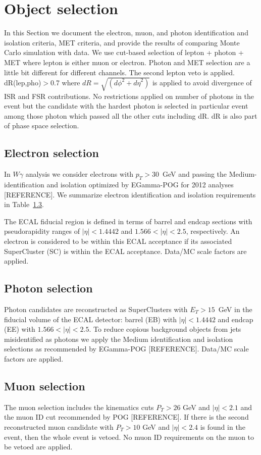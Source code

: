 \section{Object selection}
\label{sec:ObjectSelection}
In this Section we document the electron, muon,
and photon identification and isolation criteria, MET criteria, and provide the
results of comparing Monte Carlo simulation with data.
We use cut-based selection of lepton + photon + MET where lepton is either muon or electron. Photon and MET selection are a little bit different for different channels. The second lepton veto is applied.  dR(lep,pho)$>$0.7 where $dR=\sqrt{({d\phi}^2+{d\eta}^2)}$ is applied to avoid divergence of ISR and FSR contributions. No restrictions applied on number of photons in the event but the candidate with the hardest photon is selected in particular event among those photon which passed all the other cuts including dR. dR is also part of phase space selection.

\subsection{Electron selection}
\label{sec:eid}
In $W\gamma$ analysis we consider electrons with $p_T > 30$~GeV and passing
the Medium-identification and isolation optimized by EGamma-POG for 2012 analyses [REFERENCE].
We summarize electron identification and isolation requirements in Table~\ref{}.

The ECAL fiducial region is defined in terms of barrel and endcap
sections with pseudorapidity ranges of $|\eta| < 1.4442$ and  
$1.566 < |\eta| < 2.5$, respectively. An electron is considered
to be within this ECAL acceptance if its associated SuperCluster (SC) is
within the ECAL acceptance.
Data/MC scale factors are applied.

\subsection{Photon selection}
Photon candidates are reconstructed as SuperClusters with 
$E_{T} > 15$~GeV in the fiducial volume of the ECAL detector:
barrel (EB) with $|\eta|<1.4442$ and endcap (EE) with 
$1.566 < |\eta| < 2.5$. To reduce copious background objects from jets misidentified as photons 
we apply the Medium identification and isolation selections as recommended by EGamma-POG [REFERENCE].
Data/MC scale factors are applied.

\subsection{Muon selection}
The muon selection includes the kinematics cuts $P_T>26$ GeV and $|\eta|<2.1$ and the muon ID cut recommended by POG [REFERENCE]. If there is the second reconstructed muon candidate with $P_T>10$ GeV and $|\eta|<2.4$ is found in the event, then the whole event is vetoed. No muon ID requirements on the muon to be vetoed are applied.  

